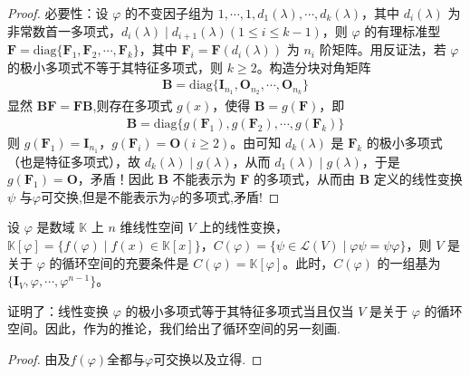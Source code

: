 \documentclass[../../main.tex]{subfiles}
\begin{document}
\begin{proof}
{\heiti 必要性：}设 $\varphi$ 的不变因子组为 $1,\cdots,1,d_1(\lambda),\cdots,d_k(\lambda)$，其中 $d_i(\lambda)$ 为非常数首一多项式，$d_i(\lambda)\mid d_{i + 1}(\lambda) (1\leqslant  i\leqslant  k - 1)$，则 $\varphi$ 的有理标准型 $\boldsymbol{F}=\mathrm{diag}\{\boldsymbol{F}_1,\boldsymbol{F}_2,\cdots,\boldsymbol{F}_k\}$，其中 $\boldsymbol{F}_i = \boldsymbol{F}(d_i(\lambda))$ 为 $n_i$ 阶矩阵。用反证法，若 $\varphi$ 的极小多项式不等于其特征多项式，则 $k\geqslant  2$。构造分块对角矩阵
\begin{align*}
\boldsymbol{B}=\mathrm{diag}\{\boldsymbol{I}_{n_1},\boldsymbol{O}_{n_2},\cdots,\boldsymbol{O}_{n_k}\}
\end{align*}
显然 $\boldsymbol{BF}=\boldsymbol{FB}$,则存在多项式 $g(x)$，使得 $\boldsymbol{B}=g(\boldsymbol{F})$，即
\begin{align*}
\boldsymbol{B}=\mathrm{diag}\{g(\boldsymbol{F}_1),g(\boldsymbol{F}_2),\cdots,g(\boldsymbol{F}_k)\}
\end{align*}
则 $g(\boldsymbol{F}_1)=\boldsymbol{I}_{n_1}$，$g(\boldsymbol{F}_i)=\boldsymbol{O}(i\geqslant  2)$。由可知 $d_k(\lambda)$ 是 $\boldsymbol{F}_k$ 的极小多项式（也是特征多项式），故 $d_k(\lambda)\mid g(\lambda)$，从而 $d_1(\lambda)\mid g(\lambda)$，于是 $g(\boldsymbol{F}_1)=\boldsymbol{O}$，矛盾！因此 $\boldsymbol{B}$ 不能表示为 $\boldsymbol{F}$ 的多项式，从而由 $\boldsymbol{B}$ 定义的线性变换 $\psi$ 与$\varphi$可交换,但是不能表示为$\varphi$的多项式,矛盾!

\end{proof}

\begin{corollary}\label{corollary:循环子空间的另一种刻画}
设 $\varphi$ 是数域 $\mathbb{K}$ 上 $n$ 维线性空间 $V$ 上的线性变换，$\mathbb{K}[\varphi]=\{f(\varphi)\mid f(x)\in\mathbb{K}[x]\}$，$C(\varphi)=\{\psi\in\mathcal{L}(V)\mid\varphi\psi = \psi\varphi\}$，则 $V$ 是关于 $\varphi$ 的循环空间的充要条件是 $C(\varphi)=\mathbb{K}[\varphi]$。此时，$C(\varphi)$ 的一组基为 $\{\boldsymbol{I}_V,\varphi,\cdots,\varphi^{n - 1}\}$。 
\end{corollary}
\begin{note}
证明了：线性变换 $\varphi$ 的极小多项式等于其特征多项式当且仅当 $V$ 是关于 $\varphi$ 的循环空间。因此，作为的推论，我们给出了循环空间的另一刻画.
\end{note}
\begin{proof}
由及$f(\varphi)$全都与$\varphi$可交换以及立得.

\end{proof}
\end{document}
